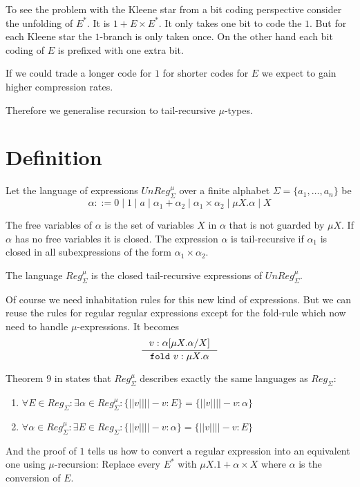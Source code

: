\documentclass[a4paper, oneside]{memoir}
\theoremstyle{definition}
\begin{document}
To see the problem with the Kleene star from a bit coding perspective consider
the unfolding of $E^{\ast}$. It is $1 + E \times E^{\ast}$. It only takes one
bit to code the $1$. But for each Kleene star the $1$-branch is only taken
once. On the other hand each bit coding of $E$ is prefixed with one extra
bit.

If we could trade a longer code for $1$ for shorter codes for $E$ we expect to
gain higher compression rates.

Therefore we generalise recursion to tail-recursive $\mu$-types.

\section{Definition}
Let the language of expressions $UnReg_{\Sigma}^{\mu}$ over a finite alphabet
$\Sigma = \{a_1, \ldots, a_n\}$ be
\[
\alpha ::= 0 \; | \; 1 \; | \; a \; | \; \alpha_1 + \alpha_2 \; | \; \alpha_1
\times \alpha_2 \; | \; \mu X. \alpha \; | \; X
\]

The free variables of $\alpha$ is the set of variables $X$ in $\alpha$ that is
not guarded by $\mu X$. If $\alpha$ has no free variables it is closed. The
expression $\alpha$ is tail-recursive if $\alpha_1$ is closed in all
subexpressions of the form $\alpha_1 \times \alpha_2$.

The language $Reg_{\Sigma}^{\mu}$ is the closed tail-recursive expressions of
$UnReg_{\Sigma}^{\mu}$.

Of course we need inhabitation rules for this new kind of expressions. But we
can reuse the rules for regular regular expressions except for the fold-rule
which now need to handle $\mu$-expressions. It becomes
\[
\inference{v : \alpha \lbrack \mu X. \alpha / X \rbrack}{\mathtt{fold}\ v : \mu X. \alpha}
\]

Theorem 9 in \cite{heni2010} states that $Reg_{\Sigma}^{\mu}$ describes exactly
the same languages as $Reg_{\Sigma}$:

\begin{enumerate}
\item $\forall E \in Reg_{\Sigma} : \exists \alpha \in Reg_{\Sigma}^{\mu} :
  \{||v|| | |- v : E\} = \{||v|| | |- v : \alpha \}$
\item $\forall \alpha \in Reg_{\Sigma}^{\mu} : \exists E \in Reg_{\Sigma} :
  \{||v|| | |- v : \alpha\} = \{||v|| | |- v : E \}$
\end{enumerate}

And the proof of $1$ tells us how to convert a regular expression into an
equivalent one using $\mu$-recursion: Replace every $E^{\ast}$ with $\mu X.1 +
\alpha \times X$ where $\alpha$ is the conversion of $E$.
\end{document}
